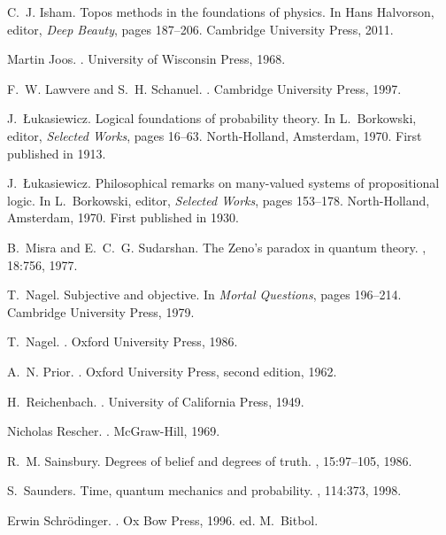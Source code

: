 \documentclass[12pt,reqno]{article}
\renewcommand{\(}{\left(}
\renewcommand{\)}{\right)}
\newcommand{\<}{\langle}
\renewcommand{\>}{\rangle}
\theoremstyle{plain} %
\begin{document}
\begin{thebibliography}{10}
C.~J. Isham.
\newblock Topos methods in the foundations of physics.
\newblock In Hans Halvorson, editor, {\em Deep Beauty}, pages 187--206.
  Cambridge University Press, 2011.

Martin Joos.
.
\newblock University of Wisconsin Press, 1968.

F.~W. Lawvere and S.~H. Schanuel.
.
\newblock Cambridge University Press, 1997.

J.~{\L}ukasiewicz.
\newblock Logical foundations of probability theory.
\newblock In L.~Borkowski, editor, {\em Selected Works}, pages 16--63.
  North-Holland, Amsterdam, 1970.
\newblock First published in 1913.

J.~{\L}ukasiewicz.
\newblock Philosophical remarks on many-valued systems of propositional logic.
\newblock In L.~Borkowski, editor, {\em Selected Works}, pages 153--178.
  North-Holland, Amsterdam, 1970.
\newblock First published in 1930.

B.~Misra and E.~C.~G. Sudarshan.
\newblock The {Z}eno's paradox in quantum theory.
, 18:756, 1977.

T.~Nagel.
\newblock Subjective and objective.
\newblock In {\em Mortal Questions}, pages 196--214. Cambridge University
  Press, 1979.

T.~Nagel.
.
\newblock Oxford University Press, 1986.

A.~N. Prior.
.
\newblock Oxford University Press, second edition, 1962.

H.~Reichenbach.
.
\newblock University of California Press, 1949.

Nicholas Rescher.
.
\newblock McGraw-Hill, 1969.

R.~M. Sainsbury.
\newblock Degrees of belief and degrees of truth.
, 15:97--105, 1986.

S.~Saunders.
\newblock Time, quantum mechanics and probability.
, 114:373, 1998.

Erwin Schr{\"o}dinger.
.
\newblock Ox Bow Press, 1996.
\newblock ed. M.~Bitbol.


\end{thebibliography}
\end{document}
